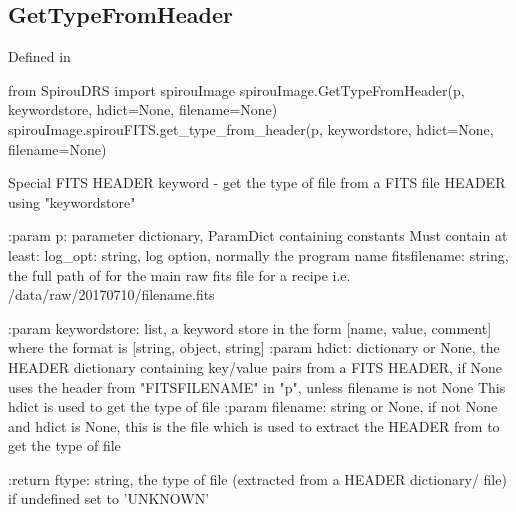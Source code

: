\noindent\begin{minipage}{\textwidth}
\subsection{GetTypeFromHeader}

Defined in \spirouImage{}

\begin{pythonbox}
from SpirouDRS import spirouImage
spirouImage.GetTypeFromHeader(p, keywordstore, hdict=None, filename=None)
spirouImage.spirouFITS.get_type_from_header(p, keywordstore, hdict=None, filename=None)
\end{pythonbox}

\begin{pythondocstring}
Special FITS HEADER keyword - get the type of file from a FITS file HEADER
using "keywordstore"

:param p: parameter dictionary, ParamDict containing constants
    Must contain at least:
            log_opt: string, log option, normally the program name
            fitsfilename: string, the full path of for the main raw fits
                          file for a recipe
                          i.e. /data/raw/20170710/filename.fits

:param keywordstore: list, a keyword store in the form
                     [name, value, comment] where the format is
                     [string, object, string]
:param hdict: dictionary or None, the HEADER dictionary containing
              key/value pairs from a FITS HEADER, if None uses the
              header from "FITSFILENAME" in "p", unless filename is not None
              This hdict is used to get the type of file
:param filename: string or None, if not None and hdict is None, this is the
                 file which is used to extract the HEADER from to get
                 the type of file

:return ftype: string, the type of file (extracted from a HEADER dictionary/
               file) if undefined set to 'UNKNOWN'
\end{pythondocstring}
\end{minipage}



